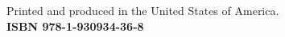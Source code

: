 \begin{minipage}[t][1.0cm][b]{\textwidth}
\begin{center}
Printed and produced in the United States of America.\\
\bf{ISBN 978-1-930934-36-8}
\end{center}
\end{minipage}
